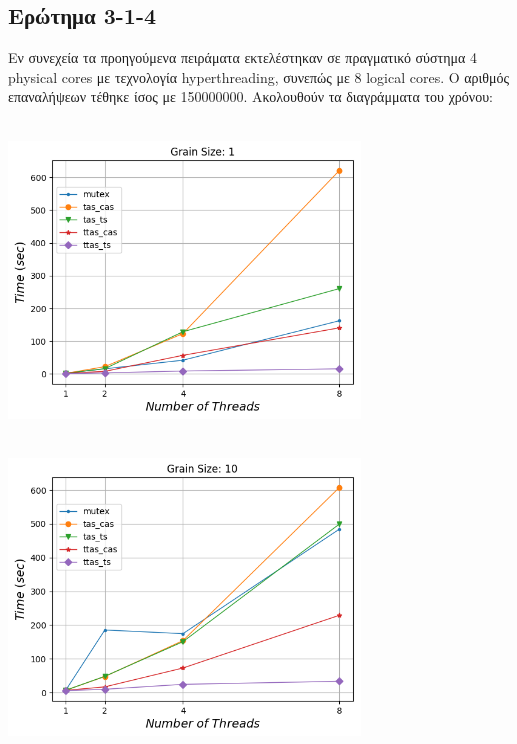 \vspace{2em}
\subsection{Ερώτημα 3-1-4}
Εν συνεχεία τα προηγούμενα πειράματα εκτελέστηκαν σε πραγματικό σύστημα 4
physical cores με τεχνολογία hyperthreading, συνεπώς με 8 logical cores. Ο
αριθμός επαναλήψεων τέθηκε ίσος με 150000000. Ακολουθούν τα διαγράμματα του χρόνου:

\begin{minipage}{\textwidth}
   \begin{center}
      \\
      \vspace{3mm}
      \includegraphics[width=0.7\textwidth]{./graphs/real/time/grain-1.png}
      \vspace{6mm}
   \end{center}
\end{minipage}

\begin{minipage}{\textwidth}
   \begin{center}
      \\
      \vspace{3mm}
      \includegraphics[width=0.7\textwidth]{./graphs/real/time/grain-10.png}
      \vspace{6mm}
   \end{center}
\end{minipage}

